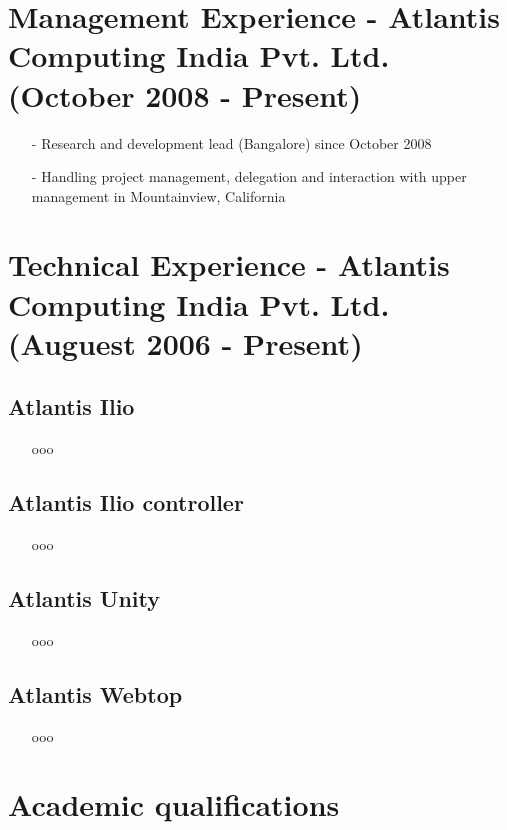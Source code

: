 \documentclass[a4paper,12pt]{article}
\begin{document}
\section{Management Experience - Atlantis Computing India
  Pvt. Ltd. (October 2008 - Present)}
\begin{itemize}
  \item[-] Research and development lead (Bangalore) since October
    2008
  \item[-] Handling project management, delegation and interaction
    with upper management in Mountainview, California
\end{itemize}

\section{Technical Experience - Atlantis Computing India
  Pvt. Ltd. (Auguest 2006 - Present)}
\subsection{Atlantis Ilio}
\begin{itemize}
\item[] ooo
\end{itemize}

\subsection{Atlantis Ilio controller}
\begin{itemize}
\item[] ooo
\end{itemize}

\subsection{Atlantis Unity}
\begin{itemize}
\item[] ooo
\end{itemize}

\subsection{Atlantis Webtop}
\begin{itemize}
\item[] ooo
\end{itemize}

\section{Academic qualifications}
\end{document}
